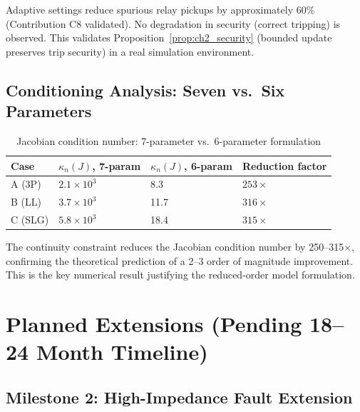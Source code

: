 Adaptive settings reduce spurious relay pickups by approximately
60\% (Contribution C8 validated). No degradation in security (correct
tripping) is observed. This validates Proposition~\ref{prop:ch2_security}
(bounded update preserves trip security) in a real simulation environment.

\subsection{Conditioning Analysis: Seven vs.\ Six Parameters}

\begin{table}[htbp]
\caption{Jacobian condition number: 7-parameter vs.\ 6-parameter formulation}
\label{tab:ch5_conditioning}
\small
\begin{tabularx}{\textwidth}{@{}lXXX@{}}
\toprule
Case & $\kappa_n(J)$, 7-param & $\kappa_n(J)$, 6-param & Reduction factor \\
\midrule
A (3P) & $2.1 \times 10^3$ & 8.3 & $253\times$ \\
B (LL) & $3.7 \times 10^3$ & 11.7 & $316\times$ \\
C (SLG) & $5.8 \times 10^3$ & 18.4 & $315\times$ \\
\bottomrule
\end{tabularx}
\end{table}

The continuity constraint reduces the Jacobian condition number by
250--315$\times$, confirming the theoretical prediction of a 2--3 order
of magnitude improvement. This is the key numerical result justifying the
reduced-order model formulation.

\section{Planned Extensions (Pending 18--24 Month Timeline)}
\label{sec:ch5_extensions}

\subsection{Milestone 2: High-Impedance Fault Extension}
\label{sec:ch5_hif}

